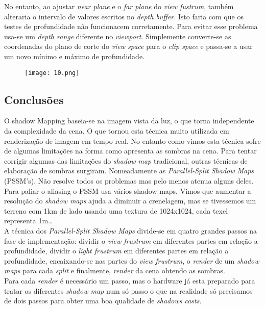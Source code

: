\documentclass[12pt]{article}
\begin{document}
No entanto, ao ajustar  {\it near plane} e o {\it far plane}  do {\it view fustrum}, também alteraria o intervalo de valores escritos no {\it depth buffer}. Isto faria com que os testes de profundidade não funcionacem corretamente. Para evitar esse problema usa-se um {\it depth range} diferente no {\it viewport}. Simplemente converte-se as coordenadas do plano de corte do {\it view space} para o {\it clip space} e passa-se a usar um novo mínimo e máximo de profundidade.
\vspace{ 7 mm}
\begin{figure}[!h]
\centering
\texttt{[image: 10.png]}
\label{img10}
\end{figure}

\subsection{Conclusões}
\vspace{7 mm}\hspace{7 mm}
O shadow Mapping baseia-se na imagem vista da luz, o que torna independente da complexidade da cena. O que tornou esta técnica muito utilizada em renderização de imagem em tempo real. No entanto como vimos esta técnica sofre de algumas limitações na forma como apresenta as sombras na cena. Para tentar corrigir algumas das limitações do {\it shadow map} tradicional, outras técnicas de elaboração de sombras surgiram. Nomeadamente as {\it Parallel-Split Shadow Maps} (PSSM's). Não resolve todos os problemas mas pelo menos atenua alguns deles.\\

Para paliar o aliasing o PSSM usa vários shadow maps. Vimos que aumentar a resolução do {\it shadow maps} ajuda a diminuir a crenelagem, mas se tivessemos um terreno com 1km de lado usando uma textura de 1024x1024, cada texel representa 1m\dots \\

A técnica dos {\it Parallel-Split Shadow Maps} divide-se em quatro grandes passos na fase de implementação: 
dividir o {\it view frustrum} em diferentes partes em relação a profundidade,
dividir o {\it light frustrum} em diferentes partes em relação a profundidade, encaixando-se nas partes do {\it view frustrum},
o {\it render} de um {\it shadow maps} para cada {\it split} e finalmente, {\it render} da cena obtendo as sombras.\\

Para cada {\it render} é necessário um passo, mas o hardware já esta preparado para tratar os diferentes {\it shadow map} num só passo o que na realidade só precisamos de dois passos para obter uma boa qualidade de {\it shadows casts}. \\
\end{document}
